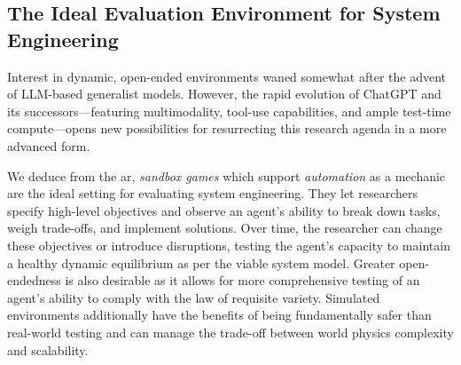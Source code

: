 \subsection{The Ideal Evaluation Environment for System Engineering}
Interest in dynamic, open-ended environments waned somewhat after the advent of LLM-based generalist models. However, the rapid evolution of ChatGPT and its successors—featuring multimodality, tool-use capabilities, and ample test-time compute—opens new possibilities for resurrecting this research agenda in a more advanced form.

We deduce from the ar, \emph{sandbox games} which support \textit{automation} as a mechanic are the ideal setting for evaluating system engineering. They let researchers specify high-level objectives and observe an agent’s ability to break down tasks, weigh trade-offs, and implement solutions. Over time, the researcher can change these objectives or introduce disruptions, testing the agent’s capacity to maintain a healthy dynamic equilibrium as per the viable system model. Greater open-endedness is also desirable as it allows for more comprehensive testing of an agent's ability to comply with the law of requisite variety. Simulated environments additionally have the benefits of being fundamentally safer than real-world testing and can manage the trade-off between world physics complexity and scalability.

